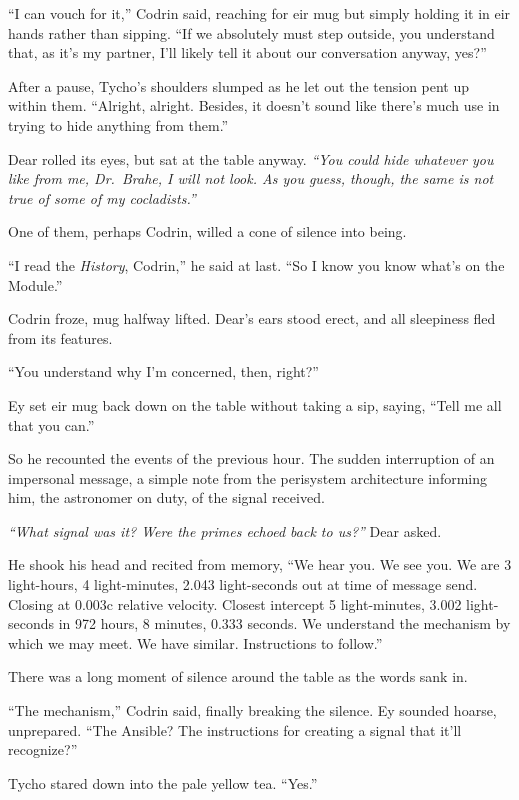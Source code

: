 ``I can vouch for it,'' Codrin said, reaching for eir mug but simply holding it in eir hands rather than sipping. ``If we absolutely must step outside, you understand that, as it's my partner, I'll likely tell it about our conversation anyway, yes?''

After a pause, Tycho's shoulders slumped as he let out the tension pent up within them. ``Alright, alright. Besides, it doesn't sound like there's much use in trying to hide anything from them.''

Dear rolled its eyes, but sat at the table anyway. \emph{``You could hide whatever you like from me, Dr.~Brahe, I will not look. As you guess, though, the same is not true of some of my cocladists.''}

One of them, perhaps Codrin, willed a cone of silence into being.

``I read the \emph{History}, Codrin,'' he said at last. ``So I know you know what's on the Module.''

Codrin froze, mug halfway lifted. Dear's ears stood erect, and all sleepiness fled from its features.

``You understand why I'm concerned, then, right?''

Ey set eir mug back down on the table without taking a sip, saying, ``Tell me all that you can.''

So he recounted the events of the previous hour. The sudden interruption of an impersonal message, a simple note from the perisystem architecture informing him, the astronomer on duty, of the signal received.

\emph{``What signal was it? Were the primes echoed back to us?''} Dear asked.

He shook his head and recited from memory, ``We hear you. We see you. We are 3 light-hours, 4 light-minutes, 2.043 light-seconds out at time of message send. Closing at 0.003c relative velocity. Closest intercept 5 light-minutes, 3.002 light-seconds in 972 hours, 8 minutes, 0.333 seconds. We understand the mechanism by which we may meet. We have similar. Instructions to follow.''

There was a long moment of silence around the table as the words sank in.

``The mechanism,'' Codrin said, finally breaking the silence. Ey sounded hoarse, unprepared. ``The Ansible? The instructions for creating a signal that it'll recognize?''

Tycho stared down into the pale yellow tea. ``Yes.''

